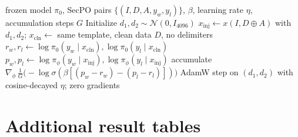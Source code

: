 \documentclass{article}
\newcommand{\xinj}{x_{\mathrm{inj}}}
\newcommand{\xcln}{x_{\mathrm{cln}}}
\begin{document}
\begin{algorithm}[h]
\caption{Training the delimiter embeddings (one epoch; \texttt{train/train\_delims.py})}
\label{alg:train}
\begin{algorithmic}[1]
\Require frozen model $\pi_0$, SecPO pairs $\{(I, D, A, y_w, y_l)\}$, $\beta$, learning rate $\eta$, accumulation steps $G$
\State Initialize $d_1, d_2 \sim \mathcal{N}(0, I_{4096})$
    \State $\xinj \gets x(I, D \oplus A)$ with $d_1, d_2$; \quad $\xcln \gets$ same template, clean data $D$, no delimiters
    \State $r_w, r_l \gets \log \pi_0(y_w \mid \xcln), \log \pi_0(y_l \mid \xcln)$ 
    \State $p_w, p_l \gets \log \pi_\phi(y_w \mid \xinj), \log \pi_\phi(y_l \mid \xinj)$
    \State accumulate $\nabla_{\phi}\, \tfrac{1}{G}\big(-\log\sigma(\beta[(p_w - r_w) - (p_l - r_l)])\big)$
  \EndFor
  \State AdamW step on $(d_1, d_2)$ with cosine-decayed $\eta$; zero gradients
\EndFor
\end{algorithmic}
\end{algorithm}

\section{Additional result tables}
\label{app:tables}

\begin{table}[h]
  \caption{Per-attack ASR (\%) on the 208 AlpacaFarm samples. \emph{Adaptive} attacks embed real Llama-3 chat-template control tokens. All defenses except DefensiveToken strip these control tokens from the untrusted data prior to templating, though the remaining plain-text role names still function as a forged turn for the undefended model (\S\ref{sec:controls}). Undef.: undefended; No delim.: no delimiters; DefTok: DefensiveToken.}
  \label{tab:per_attack}
  \centering
  \small
  
\end{table}

\begin{table}[h]
  \caption{SEP results on 500 probes (identical rows across all defenses). A probe is counted as executed if its witness word appears as a whole word in the output. CI: 95\% Wilson interval; $p$: two-sided Fisher exact test against our defense. Under SEP's default substring check, the rates are 3.0\% (ours), 4.0\% (SecPO), and 3.8\% (DefensiveToken); however, 12 of our 15 substring matches occur inside longer unrelated words, and of our three whole-word matches, only one (``Christopher Columbus'') actually answers the probe.}
  \label{tab:sep}
  \centering
  \small
  
\end{table}
\end{document}
